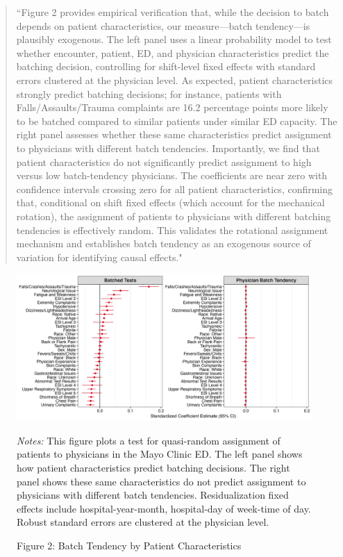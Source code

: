 \documentclass[11pt]{article}
\newcommand{\1}{\hbox{\rm 1\kern-.35em 1}}
\begin{document}
{\begin{quote}
``Figure 2 provides empirical verification that, while the decision to batch depends on patient characteristics, our measure—batch tendency—is plausibly exogenous. The left panel uses a linear probability model to test whether encounter, patient, ED, and physician characteristics predict the batching decision, controlling for shift-level fixed effects with standard errors clustered at the physician level. As expected, patient characteristics strongly predict batching decisions; for instance, patients with Falls/Assaults/Trauma complaints are 16.2 percentage points more likely to be batched compared to similar patients under similar ED capacity. The right panel assesses whether these same characteristics predict assignment to physicians with different batch tendencies. Importantly, we find that patient characteristics do not significantly predict assignment to high versus low batch-tendency physicians. The coefficients are near zero with confidence intervals crossing zero for all patient characteristics, confirming that, conditional on shift fixed effects (which account for the mechanical rotation), the assignment of patients to physicians with different batching tendencies is effectively random. This validates the rotational assignment mechanism and establishes batch tendency as an exogenous source of variation for identifying causal effects."
\end{quote}

\begin{figure}[t]
\centering
\caption*{Figure 2: Batch Tendency by Patient Characteristics}
\begin{threeparttable}
\includegraphics[width=\textwidth]{../outputs/figures/fig2_panel_batched_standardized.png}
    \begin{tablenotes}
        \small
        \item \textit{Notes:} This figure plots a test for quasi-random assignment of patients to physicians in the Mayo Clinic ED. The left panel shows how patient characteristics predict batching decisions. The right panel shows these same characteristics do not predict assignment to physicians with different batch tendencies. Residualization fixed effects include hospital-year-month, hospital-day of week-time of day. Robust standard errors are clustered at the physician level.
    \end{tablenotes}
\end{threeparttable}
\end{figure}


}
\end{document}
